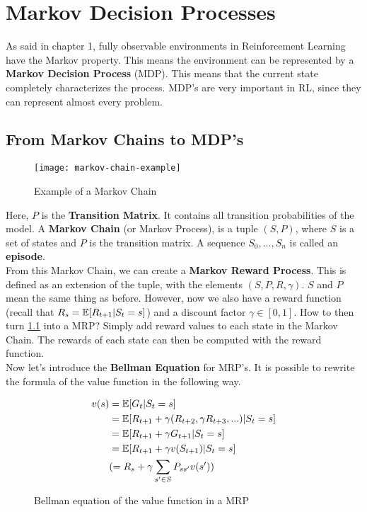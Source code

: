 \chapter{Markov Decision Processes}
As said in chapter 1, fully observable environments in Reinforcement Learning have the Markov property. This means the environment can be represented by a \textbf{Markov Decision Process} (MDP). This means that the current state completely characterizes the process. MDP's are very important in RL, since they can represent almost every problem.\\

\section{From Markov Chains to MDP's}

\begin{figure}[h]
	\texttt{[image: markov-chain-example]}
	\caption{Example of a Markov Chain}
	\label{ex:markov-chain}
\end{figure}

Here, $P$ is the \textbf{Transition Matrix}. It contains all transition probabilities of the model. A \textbf{Markov Chain} (or Markov Process), is a tuple $(S, P)$, where $S$ is a set of states and $P$ is the transition matrix. A sequence $S_0, ..., S_n$ is called an \textbf{episode}.\\

From this Markov Chain, we can create a \textbf{Markov Reward Process}. This is defined as an extension of the tuple, with the elements $(S, P, R, \gamma)$. $S$ and $P$ mean the same thing as before. However, now we also have a reward function (recall that $R_s = \operatorname{\mathbb{E}}[R_{t+1} | S_t=s]$) and a discount factor $\gamma \in [0, 1]$. How to then turn \ref{ex:markov-chain} into a MRP? Simply add reward values to each state in the Markov Chain. The rewards of each state can then be computed with the reward function.\\

Now let's introduce the \textbf{Bellman Equation} for MRP's. It is possible to rewrite the formula of the value function in the following way.

\begin{figure}[h]
	\begin{equation}
		\begin{aligned}
			v(s)&= \operatorname{\mathbb{E}}[G_t | S_t = s]\\
				&= \operatorname{\mathbb{E}}[R_{t+1} + \gamma (R_{t+2}, \gamma R_{t+3}, ...) | S_t = s]\\
				&= \operatorname{\mathbb{E}}[R_{t+1} + \gamma G_{t+1} | S_t = s]\\
				&= \operatorname{\mathbb{E}}[R_{t+1} + \gamma v(S_{t+1}) | S_t = s]\\
				&(= R_s + \gamma \sum_{s' \in S} P_{ss'}v(s'))
		\end{aligned}
	\end{equation}
	\caption{Bellman equation of the value function in a MRP}
	\label{form:bellman-value-mrp}
\end{figure}

